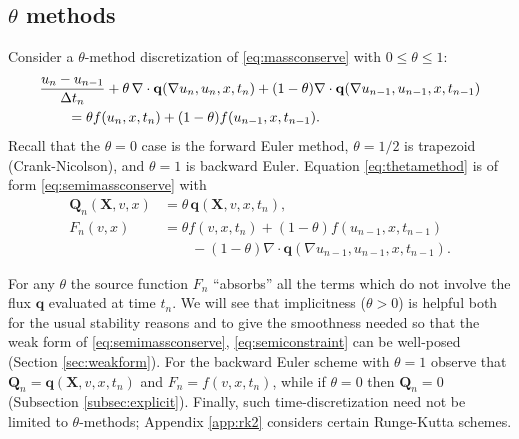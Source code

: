 \documentclass[final,onefignum]{siamart190516}
\newcommand\bq{\mathbf{q}}
\newcommand\bQ{\mathbf{Q}}
\newcommand\bX{\mathbf{X}}
\newcommand{\Div}{\nabla\cdot}
\newcommand{\grad}{\nabla}
\begin{document}
\subsection{$\theta$ methods}  \label{subsec:thetamethods}  Consider a $\theta$-method discretization \cite{MortonMayers2005} of \eqref{eq:massconserve} with $0\le \theta \le 1$:
\begin{align}
  &\frac{u_n - u_{n-1}}{\Delta t_n} + \theta\, \Div \bq(\grad u_n,u_n,x,t_n) + (1-\theta) \Div \bq(\grad u_{n-1},u_{n-1},x,t_{n-1}) \label{eq:thetamethod} \\
  &\qquad =  \theta f(u_n,x,t_n) + (1-\theta) f(u_{n-1},x,t_{n-1}). \notag
\end{align}
Recall that the $\theta=0$ case is the forward Euler method, $\theta=1/2$ is trapezoid (Crank-Nicolson), and $\theta=1$ is backward Euler.  Equation \eqref{eq:thetamethod} is of form \eqref{eq:semimassconserve} with
\begin{align*}
\bQ_n(\bX,v,x) &= \theta\, \bq(\bX,v,x,t_n), \\
F_n(v,x)       &= \theta f(v,x,t_n) + (1-\theta) f(u_{n-1},x,t_{n-1}) \\
               &\qquad - (1-\theta) \Div \bq(\grad u_{n-1},u_{n-1},x,t_{n-1}).
\end{align*}

For any $\theta$ the source function $F_n$ ``absorbs'' all the terms which do not involve the flux $\bq$ evaluated at time $t_n$.  We will see that implicitness ($\theta>0$) is helpful both for the usual stability reasons \cite{MortonMayers2005} and to give the smoothness needed so that the weak form of \eqref{eq:semimassconserve}, \eqref{eq:semiconstraint} can be well-posed (Section \ref{sec:weakform}).  For the backward Euler scheme with $\theta=1$ observe that $\bQ_n = \bq(\bX,v,x,t_n)$ and $F_n = f(v,x,t_n)$, while if $\theta=0$ then $\bQ_n=0$ (Subsection \ref{subsec:explicit}).  Finally, such time-discretization need not be limited to $\theta$-methods; Appendix \ref{app:rk2} considers certain Runge-Kutta schemes.
\end{document}
